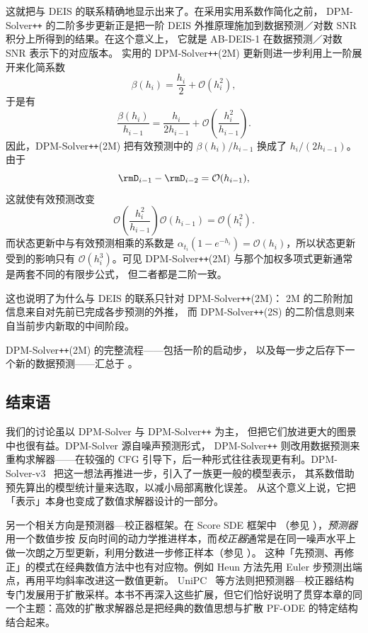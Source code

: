 这就把与 DEIS 的联系精确地显示出来了。在采用实用系数作简化之前，
DPM-Solver\texttt{++} 的二阶多步更新正是把一阶 DEIS 外推原理施加到数据预测／对数 SNR 积分上所得到的结果。在这个意义上，
它就是 AB-DEIS-1 在数据预测／对数 SNR 表示下的对应版本。
实用的 DPM-Solver\texttt{++}(2M) 更新则进一步利用上一阶展开来化简系数
\[
\beta(h_i)
=
\frac{h_i}{2}
+
\mathcal O(h_i^2),
\]
于是有
\[
\frac{\beta(h_i)}{h_{i-1}}
=
\frac{h_i}{2h_{i-1}}
+
\mathcal O\left(
\frac{h_i^2}{h_{i-1}}
\right).
\]
因此，DPM-Solver\texttt{++}(2M) 把有效预测中的
$\beta(h_i)/h_{i-1}$ 换成了 $h_i/(2h_{i-1})$。由于
\[
\rmD_{i-1}-\rmD_{i-2}
=
\mathcal O(h_{i-1}),
\]
这就使有效预测改变
\[
\mathcal O\left(
\frac{h_i^2}{h_{i-1}}
\right)
\mathcal O(h_{i-1})
=
\mathcal O(h_i^2).
\]
而状态更新中与有效预测相乘的系数是
$\alpha_{t_i}(1-e^{-h_i})=\mathcal O(h_i)$，所以状态更新受到的影响只有 $\mathcal O(h_i^3)$。可见 DPM-Solver\texttt{++}(2M) 与那个加权多项式更新通常是两套不同的有限步公式，
但二者都是二阶一致。

这也说明了为什么与 DEIS 的联系只针对 DPM-Solver\texttt{++}(2M)：
2M 的二阶附加信息来自对先前已完成各步预测的外推，
而 DPM-Solver\texttt{++}(2S) 的二阶信息则来自当前步内新取的中间阶段。

DPM-Solver\texttt{++}(2M) 的完整流程——包括一阶的启动步，
以及每一步之后存下一个新的数据预测——汇总于 。


\subsection{结束语}
我们的讨论虽以 DPM-Solver 与 DPM-Solver\texttt{++} 为主，
但把它们放进更大的图景中也很有益。DPM-Solver 源自噪声预测形式，
DPM-Solver\texttt{++} 则改用数据预测来重构求解器——在较强的 CFG
引导下，后一种形式往往表现更有利。DPM-Solver-v3~\citep{zheng2023dpm}
把这一想法再推进一步，引入了一族更一般的模型表示，
其系数借助预先算出的模型统计量来选取，以减小局部离散化误差。
从这个意义上说，它把「表示」本身也变成了数值求解器设计的一部分。

另一个相关方向是预测器—校正器框架。在 Score SDE 框架中
（参见 ），\emph{预测器}用一个数值步按
反向时间的动力学推进样本，而\emph{校正器}通常是在同一噪声水平上
做一次朗之万型更新，利用分数进一步修正样本（参见 ）。
这种「先预测、再修正」的模式在经典数值方法中也有对应物。例如
Heun 方法先用 Euler 步预测出端点，再用平均斜率改进这一数值更新。
UniPC~\citep{zhao2023unipc} 等方法则把预测器—校正器结构专门发展用于扩散采样。本书不再深入这些扩展，但它们恰好说明了贯穿本章的同一个主题：高效的扩散求解器总是把经典的数值思想与扩散 PF-ODE 的特定结构结合起来。


